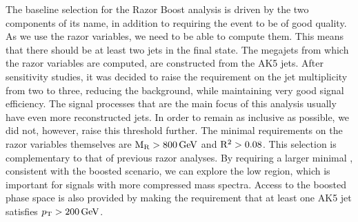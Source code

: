 
% 
% 

The baseline selection for the Razor Boost analysis is driven by the two components of its name, in
addition to requiring the event to be of good quality.
As we use the razor variables, we need to be able to compute them. This means that there should be
at least two jets in the final state. The megajets from which the razor variables are computed, are
constructed from the AK5 jets.  
After sensitivity studies, it was decided to raise the requirement on the jet multiplicity from two
to three, reducing the background, while maintaining very good signal efficiency. The signal
processes that are the main focus of this analysis usually have even more reconstructed jets. In
order to remain as inclusive as possible, we did not, however, raise this threshold further.
The minimal requirements on the razor variables themselves are $\mathrm{M_R} > 800\,\text{Ge\hspace{-.08em}V}$ and $\mathrm{R^2} > 0.08$.
This selection is complementary to that of previous razor analyses. By requiring a larger
minimal \mr, consistent with the boosted scenario, we can explore the low \rsq region, which is
important for signals with more compressed mass spectra.
Access to the boosted phase space is also provided by making the requirement that at least one AK5
jet satisfies $p_{\mathrm{T}} > 200\,\text{Ge\hspace{-.08em}V}$. 

